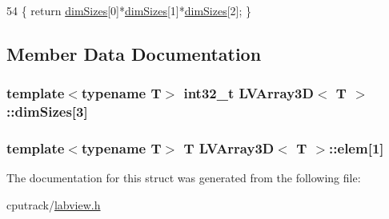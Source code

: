 \begin{DoxyCode}
54 \{ \textcolor{keywordflow}{return} \hyperlink{struct_l_v_array3_d_a093817a34523cd25b5eb0294657674fd}{dimSizes}[0]*\hyperlink{struct_l_v_array3_d_a093817a34523cd25b5eb0294657674fd}{dimSizes}[1]*\hyperlink{struct_l_v_array3_d_a093817a34523cd25b5eb0294657674fd}{dimSizes}[2]; \}
\end{DoxyCode}


\subsection{Member Data Documentation}
\subsubsection[{\texorpdfstring{dim\+Sizes}{dimSizes}}]{\setlength{\rightskip}{0pt plus 5cm}template$<$typename T$>$ int32\+\_\+t {\bf L\+V\+Array3D}$<$ T $>$\+::dim\+Sizes\mbox{[}3\mbox{]}}\hypertarget{struct_l_v_array3_d_a093817a34523cd25b5eb0294657674fd}{}\label{struct_l_v_array3_d_a093817a34523cd25b5eb0294657674fd}
\subsubsection[{\texorpdfstring{elem}{elem}}]{\setlength{\rightskip}{0pt plus 5cm}template$<$typename T$>$ T {\bf L\+V\+Array3D}$<$ T $>$\+::elem\mbox{[}1\mbox{]}}\hypertarget{struct_l_v_array3_d_ab60caf69798b33f0485205b62bd38c65}{}\label{struct_l_v_array3_d_ab60caf69798b33f0485205b62bd38c65}


The documentation for this struct was generated from the following file\+:\begin{DoxyCompactItemize}
\item 
cputrack/\hyperlink{labview_8h}{labview.\+h}\end{DoxyCompactItemize}
